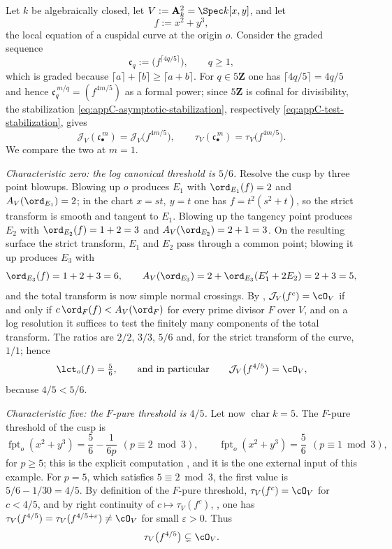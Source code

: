 \begin{example}
\label{ex:ch40-cusp}
Let $k$ be algebraically closed, let $V:=\mathbf A^2_k=\Spec k[x,y]$, and
let
\[
 f:=x^2+y^3,
\]
the local equation of a cuspidal curve at the origin $o$.  Consider the
graded sequence
\[
 \mathfrak c_q:=\bigl(f^{\lceil 4q/5\rceil}\bigr),
 \qquad q\ge1,
\]
which is graded because
$\lceil a\rceil+\lceil b\rceil\ge\lceil a+b\rceil$.  For $q\in5\mathbf Z$
one has $\lceil4q/5\rceil=4q/5$ and hence
$\mathfrak c_q^{\,m/q}=(f^{4m/5})$ as a formal power; since
$5\mathbf Z$ is cofinal for divisibility, the stabilization
\eqref{eq:appC-asymptotic-stabilization}, respectively
\eqref{eq:appC-test-stabilization}, gives
\[
 \mathcal J_V(\mathfrak c_\bullet^{\,m})=\mathcal J_V\bigl(f^{4m/5}\bigr),
 \qquad
 \tau_V(\mathfrak c_\bullet^{\,m})=\tau_V\bigl(f^{4m/5}\bigr).
\]
We compare the two at $m=1$.

\emph{Characteristic zero: the log canonical threshold is $5/6$.}  Resolve
the cusp by three point blowups.  Blowing up $o$ produces $E_1$ with
$\ord_{E_1}(f)=2$ and $A_V(\ord_{E_1})=2$; in the chart
$x=st,\ y=t$ one has $f=t^2(s^2+t)$, so the strict transform is smooth
and tangent to $E_1$.  Blowing up the tangency point produces $E_2$ with
$\ord_{E_2}(f)=1+2=3$ and $A_V(\ord_{E_2})=2+1=3$.  On the resulting
surface the strict transform, $E_1$ and $E_2$ pass through a common
point; blowing it up produces $E_3$ with
\[
 \ord_{E_3}(f)=1+2+3=6,
 \qquad
 A_V(\ord_{E_3})=2+\ord_{E_3}(E_1'+2E_2)=2+3=5,
\]
and the total transform is now simple normal crossings.  By
, $\mathcal J_V(f^{c})=\cO_V$ if and
only if $c\,\ord_F(f)<A_V(\ord_F)$ for every prime divisor $F$ over
$V$, and on a log resolution it suffices to test the finitely many
components of the total transform.  The ratios are
$2/2$, $3/3$, $5/6$ and, for the strict transform of the curve,
$1/1$; hence
\[
 \lct_o(f)=\tfrac56,
 \qquad\text{and in particular}\qquad
 \mathcal J_V\bigl(f^{4/5}\bigr)=\cO_V,
\]
because $4/5<5/6$.

\emph{Characteristic five: the $F$-pure threshold is $4/5$.}  Let now
$\operatorname{char}k=5$.  The $F$-pure threshold of the cusp is
\[
 \operatorname{fpt}_o(x^2+y^3)=\frac56-\frac1{6p}
 \ \ (p\equiv2\bmod 3),
 \qquad
 \operatorname{fpt}_o(x^2+y^3)=\frac56
 \ \ (p\equiv1\bmod3),
\]
for $p\ge5$; this is the explicit computation
\cite[Example~4.3]{MTW05}, and it is the one external input of this example.
For $p=5$, which satisfies $5\equiv2\bmod3$, the first value is
$5/6-1/30=4/5$.  By definition of the $F$-pure threshold,
$\tau_V(f^{c})=\cO_V$ for $c<4/5$, and by right continuity of
$c\mapsto\tau_V(f^c)$, \cite[Theorem~6.6]{ST12}, one has
$\tau_V(f^{4/5})=\tau_V(f^{4/5+\varepsilon})\ne\cO_V$ for small
$\varepsilon>0$.  Thus
\[
 \tau_V\bigl(f^{4/5}\bigr)\subsetneq\cO_V .
\]


\end{example}
